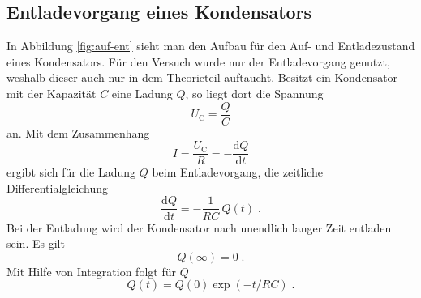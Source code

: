 \subsection{Entladevorgang eines Kondensators}
In Abbildung \ref{fig:auf-ent} sieht man den Aufbau für den Auf- und Entladezustand eines Kondensators.
Für den Versuch wurde nur der Entladevorgang genutzt, weshalb dieser auch nur in dem Theorieteil auftaucht.
Besitzt ein Kondensator mit der Kapazität $C$ eine Ladung $Q$, so liegt dort die Spannung 
\begin{equation*}
    U_\text{C}=\frac{Q}{C}
\end{equation*}
an. Mit dem Zusammenhang
\begin{equation*}
    I=\frac{U_\text{C}}{R}=- \frac{\text{d}Q}{\text{d}t}
\end{equation*}
ergibt sich für die Ladung $Q$ beim Entladevorgang, die zeitliche Differentialgleichung
\begin{equation}
    \label{eqn:Q-DGL}
    \frac{\text{d}Q}{\text{d}t}=-\frac{1}{RC}\,Q(t)\; \text{.}
\end{equation}
Bei der Entladung wird der Kondensator nach unendlich langer Zeit entladen sein. Es gilt
\begin{equation*}
    Q(\infty)=0\; \text{.}
\end{equation*}
Mit Hilfe von Integration folgt für $Q$
\begin{equation}
    Q(t)=Q(0)\exp(-t/RC)\; \text{.} \label{eqn:Charge}
\end{equation}
